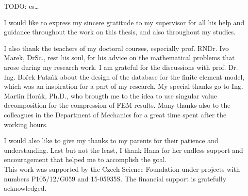 \documentclass[
11pt, %
english, %
singlespacing, %
headsepline, %
]{MastersDoctoralThesis} %
\begin{document}
\begin{abstract}
\noindent
\textbf{\keywordstitle} \keywordnames
\end{abstract}

\begin{abstractcs}
  \addchaptertocentry{\abstractnamecs} %
  TODO: cs\ldots\\

  \noindent
  \textbf{\keywordstitlecs} \keywordnamescs
\end{abstractcs}


\begin{acknowledgements}
\addchaptertocentry{\acknowledgementname} %

I would like to express my sincere gratitude to my supervisor \supname{} for all his help and guidance throughout the work on this thesis, and also throughout my studies.

I also thank the teachers of my doctoral courses, especially prof. RNDr. Ivo Marek, DrSc., rest his soul, for his advice on the mathematical problems that arose during my research work. I am grateful for the discussions with prof. Dr. Ing. Bo\v{r}ek Patz\'ak about the design of the database for the finite element model, which was an inspiration for a part of my research. My special thanks go to Ing. Martin Hor\'ak, Ph.D., who brougth me to the idea to use singular value decomposition for the compression of FEM results. Many thanks also to the colleagues in the Department of Mechanics for a great time spent after the working hours.

I would also like to give my thanks to my parents for their patience and understanding. Last but not the least, I thank Hana for her endless support and encouragement that helped me to accomplish the goal.\\

This work was supported by the Czech Science Foundation under projects with numbers P105/12/G059 and 15-05935S. The financial support is gratefully acknowledged.


\end{acknowledgements}
\end{document}
